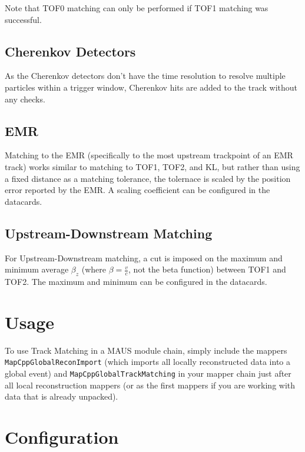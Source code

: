 Note that TOF0 matching can only be performed if TOF1 matching was successful.

\subsection{Cherenkov Detectors}\label{subsec:tmckovs}

As the Cherenkov detectors don't have the time resolution to resolve multiple particles within a trigger window,
Cherenkov hits are added to the track without any checks.

\subsection{EMR}\label{subsec:tmemr}

Matching to the EMR (specifically to the most upstream trackpoint of an EMR track) works similar to matching to TOF1,
TOF2, and KL, but rather than using a fixed distance as a matching tolerance, the tolernace is scaled by the position
error reported by the EMR. A scaling coefficient can be configured in the datacards.

\subsection{Upstream-Downstream Matching}\label{subsec:tmusdsmatching}

For Upstream-Downstream matching, a cut is imposed on the maximum and minimum average $\beta_{z}$ (where
$\beta = \frac{v}{c}$, not the beta function) between TOF1 and TOF2. The maximum and minimum can be configured in the
datacards.

\section{Usage}\label{sec:tmusage}

To use Track Matching in a MAUS module chain, simply include the mappers \texttt{MapCppGlobalReconImport} (which
imports all locally reconstructed data into a global event) and \texttt{MapCppGlobalTrackMatching} in your mapper chain
just after all local reconstruction mappers (or as the first mappers if you are working with data that is already unpacked).

\section{Configuration}\label{sec:tmconfig}


